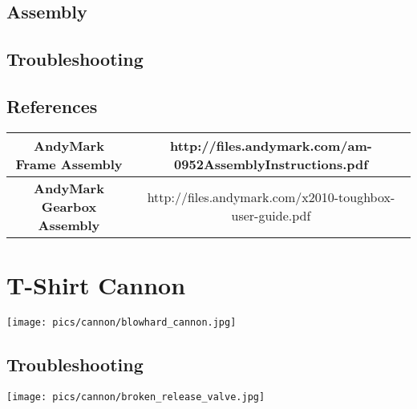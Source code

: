 \documentclass[letterpaper,12pt]{article}
\begin{document}
\subsection{Assembly}
\subsection{Troubleshooting}
\subsection{References}

\begin{table}[h!]
  \begin{tabular}{| c | c |}
    \hline
    \textbf{AndyMark Frame Assembly} &  http://files.andymark.com/am-0952AssemblyInstructions.pdf\\
    \hline
    \textbf{AndyMark Gearbox Assembly} &  http://files.andymark.com/x2010-toughbox-user-guide.pdf\\
    \hline
  \end{tabular}
  \label{tab:fire_cmd_msg}
\end{table}

\section{T-Shirt Cannon}
\begin{center}
    \texttt{[image: pics/cannon/blowhard\_cannon.jpg]}
\end{center}

\subsection{Troubleshooting}
\begin{center}
    \texttt{[image: pics/cannon/broken\_release\_valve.jpg]}
\end{center}
\end{document}
